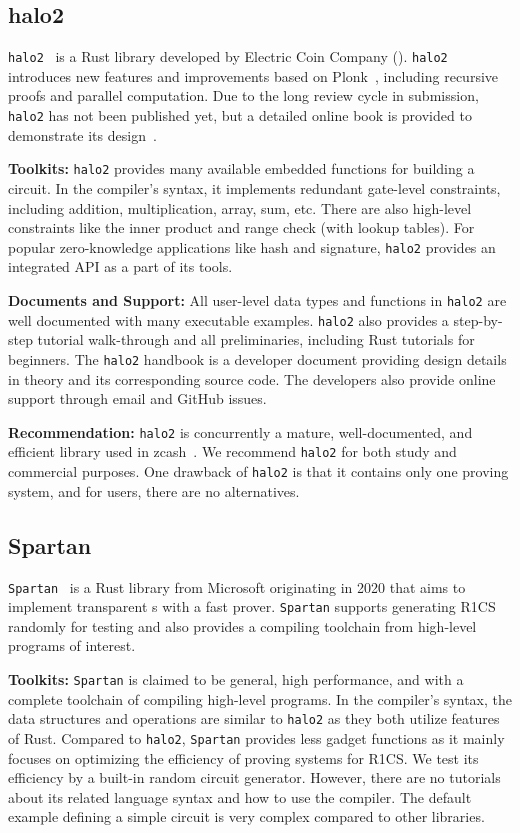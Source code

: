 \documentclass[letterpaper,twocolumn,10pt]{article}
\theoremstyle{definition}
\newcommand{\mypara}[1]{\noindent\textbf{{#1: }}}
\newcommand{\zk}{\text{zk-SNARK}\xspace}
\newcommand{\new}[1]{{#1}\xspace}
\newcommand{\lib}[1]{\texttt{#1}\xspace}
\begin{document}
\subsection{halo2}
\lib{halo2}~\cite{halo2} is a Rust library developed by Electric Coin Company (). \lib{halo2} introduces new features and improvements based on Plonk~\cite{gabizon2019plonk}, including recursive proofs and parallel computation. Due to the long review cycle in submission, \lib{halo2} has not been published yet, but a detailed online book is provided to demonstrate its design~\cite{halo2book}.

\mypara{Toolkits} \lib{halo2} provides many available embedded functions for building a circuit. \new{In the compiler's syntax, }it implements redundant gate-level constraints, including addition, multiplication, array, sum, etc. There are also high-level constraints like the inner product and range check (with lookup tables). For popular zero-knowledge applications like hash and signature, \lib{halo2} provides an integrated API as a part of its tools.

\mypara{Documents and Support} All user-level data types and functions in \lib{halo2} are well documented with many executable examples. \lib{halo2} also provides a step-by-step tutorial walk-through and all preliminaries, including Rust tutorials for beginners. The \lib{halo2} handbook is a developer document providing design details in theory and its corresponding source code. The developers also provide online support through email and GitHub issues.

\mypara{Recommendation} 
\lib{halo2} is concurrently a mature, well-documented, and efficient library used in zcash~\cite{sasson2014zerocash}. We recommend \lib{halo2} for both study and commercial purposes. One drawback of \lib{halo2} is that it contains only one proving system, and for users, there are no alternatives.

\subsection{Spartan}
\lib{Spartan}~\cite{spartan} is a Rust library from Microsoft originating in 2020 that aims to implement transparent {\zk}s with a fast prover. \lib{Spartan} supports generating R1CS randomly for testing and also provides a compiling toolchain from high-level programs of interest. 

\mypara{Toolkits} \lib{Spartan} is claimed to be general, high performance, and with a complete toolchain of compiling high-level programs. \new{In the compiler's syntax, the data structures and operations are similar to \lib{halo2} \cite{halo2} as they both utilize features of Rust. Compared to \lib{halo2}, \lib{Spartan} provides less gadget functions as it mainly focuses on optimizing the efficiency of proving systems for R1CS.}
We test its efficiency by a built-in random circuit generator. However, there are no tutorials about its related language syntax and how to use the compiler. The default example defining a simple circuit is very complex compared to other libraries.
\end{document}
